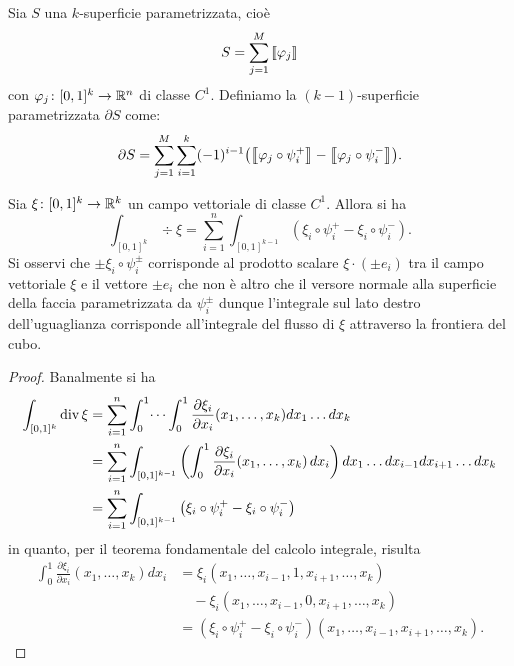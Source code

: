 \begin{definition}
Sia $S$ una $k$-superficie parametrizzata, cioè 
\[
   S = \sum_{j=1}^M {\left\llbracket \varphi_j \right\rrbracket}
\]
con $\varphi_j\colon [0,1]^k \to {\mathbb R}^n$ di classe $C^1$.
Definiamo la $(k-1)$-superficie parametrizzata $\partial S$ come:
\[
 \partial S = \sum_{j=1}^M \sum_{i=1}^k (-1)^{i-1}{\left( {\left\llbracket \varphi_j \circ \psi_i^+ \right\rrbracket} - {\left\llbracket \varphi_j \circ \psi_i^- \right\rrbracket} \right)}.
\]
\end{definition}

\begin{theorem}
  Sia $\xi\colon [0,1]^k\to {\mathbb R}^k$ un campo vettoriale di classe $C^1$.
  Allora si ha 
  \[
     \int_{[0,1]^k} \div \xi = \sum_{i=1}^n \int_{[0,1]^{k-1}} (\xi_i \circ \psi_i^+ - \xi_i \circ \psi_i^-).
  \]
  Si osservi che $\pm \xi_i \circ \psi_i^\pm$ corrisponde al prodotto 
  scalare $\xi \cdot (\pm e_i)$ tra il campo vettoriale $\xi$ e il vettore $\pm e_i$
  che non è altro che il versore normale alla superficie della faccia parametrizzata da $\psi_i^\pm$
  dunque l'integrale sul lato destro dell'uguaglianza corrisponde all'integrale 
  del flusso di $\xi$ attraverso la frontiera del cubo.
\end{theorem}
\begin{proof}
Banalmente si ha
\begin{align*}
    \int_{[0,1]^k} \operatorname{div} \xi 
    &= \sum_{i=1}^n \int_0^1 \dots \int_0^1 \frac{\partial \xi_i}{\partial x_i}(x_1,\dots,x_k) dx_1 \dots dx_k \\
    &= \sum_{i=1}^n \int_{[0,1]^{k-1}} {\left( \int_0^1 \frac{\partial \xi_i}{\partial x_i}(x_1,\dots,x_k)\, dx_i \right)}\, dx_1 \dots dx_{i-1} dx_{i+1} \dots dx_k \\ 
    &= \sum_{i=1}^n \int_{[0,1]^{k-1}} {\left( \xi_i \circ \psi_i^+ - \xi_i \circ \psi_i^- \right)}
\end{align*}
in quanto, per il teorema fondamentale del calcolo integrale, risulta 
\begin{align*}
  \int_0^1 \frac{\partial \xi_i}{\partial x_i}(x_1,\dots,x_k) dx_i
  &= \xi_i(x_1,\dots,x_{i-1},1,x_{i+1},\dots,x_k)\\ 
  &\quad - \xi_i(x_1,\dots,x_{i-1},0,x_{i+1},\dots,x_k)\\
  &= (\xi_i \circ \psi_i^+ -\xi_i \circ \psi_i^-)(x_1,\dots,x_{i-1},x_{i+1},\dots,x_k).
\end{align*}
\end{proof}

